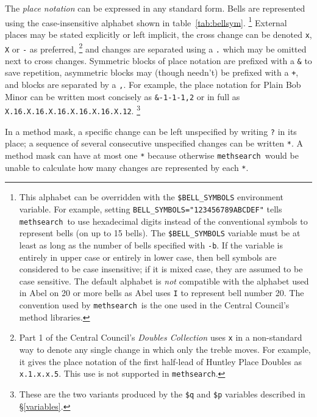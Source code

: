\documentclass[a4paper,11pt,oneside]{book}
\makeatletter
\newcommand{\fspecd}[1]{\index{#1@{\hspace*{-\fspecwidth}\texttt{\$#1}}|ulink}}
\newcommand{\symidx}[2]{} %
\def\methsearch{\texttt{meth\-search}}
\newcommand{\sref}[1]{\hyperref[#1]{\S\ref{#1}}}
\makeatother
\begin{document}
The \textit{place notation} can be expressed in any standard form.  
Bells are represented using the case-insensitive alphabet shown in
table~\ref{tab:bellsym}.%
\footnote{This alphabet can be overridden with the \verb+$BELL_SYMBOLS+
environment variable.\fspecd{BELL\_SYMBOLS}  
For example, setting \verb+BELL_SYMBOLS="123456789ABCDEF"+
tells \methsearch\ to use hexadecimal digits instead of the conventional 
symbols to represent bells (on up to 15 bells).  
The \verb+$BELL_SYMBOLS+ variable must be at least
as long as the number of bells specified with \verb+-b+.  If the variable
is entirely in upper case or entirely in lower case, 
then bell symbols are considered to be case insensitive; 
if it is mixed case, they are assumed to be case sensitive.  
The default alphabet is \textit{not} compatible with
the alphabet used in Abel on 20 or more bells as Abel uses 
\verb+I+ to represent bell number 20.  The convention used by \methsearch\ is
the one used in the Central Council's method libraries.}
External places may be stated
explicitly or left implicit, the cross change can be denoted \verb+x+, 
\verb+X+ or \verb+-+ as preferred,%
\symidx{-}{cross change}%
\footnote{Part 1 of the Central Council's \textit{Doubles Collection}
uses \verb+x+ in a non-standard way to denote any single change in which only
the treble moves.  For example, it gives the place notation of the first 
half-lead of Huntley Place Doubles as \texttt{x.1.x.x.5}. 
This use is not supported in \methsearch.}
and changes are separated using a \verb+.+\symidx{.}{place notation} 
which may be omitted next to cross
changes.  Symmetric blocks of place notation are prefixed with a 
\verb+&+\symidx{\&}{place notation} to save repetition, asymmetric blocks 
may (though needn't) be prefixed with a \verb-+-,\symidx{+}{place notation} 
and blocks are separated by a \verb+,+.\symidx{,}{place notation}  For example,
the place notation for Plain Bob Minor can be written most concisely
as \verb+&-1-1-1,2+ or in full as \verb-X.16.X.16.X.16.X.16.X.16.X.12-.%
\footnote{These are the two variants produced by the \verb+$q+ and
\verb+$p+ variables described in \sref{variables}.}

In a method mask, a specific change can be left unspecified by writing 
\verb+?+\symidx{?}{method mask} in its place; 
a sequence of several consecutive 
unspecified changes can be written \verb+*+.\symidx{*}{method mask}  
A method mask can have at most one \verb+*+
because otherwise \methsearch\ would be unable 
to calculate how many changes are represented by each \verb+*+.
\end{document}
